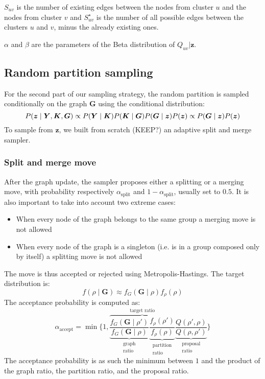 $S_{uv}$ is the number of existing edges between the nodes from cluster $u$ and the nodes from cluster $v$ and $S^{\star}_{uv}$ is the number of all possible edges between the clusters $u$ and $v$, minus the already existing ones. 

$\alpha$ and $\beta$ are the parameters of the Beta distribution of $Q_{uv}\vert \bm{z}$.

\subsection{Random partition sampling}
For the second part of our sampling strategy, the random partition is sampled conditionally on the graph $\bm{G}$ using the conditional distribution:
\begin{equation*}
    \small P(\bm{z} \mid \bm{Y},\bm{K},\bm{G}) \propto P(\bm{Y} \mid \bm{K})P(\bm{K} \mid \bm{G})P(\bm{G} \mid \bm{z})P(\bm{z}) \propto P(\bm{G} \mid \bm{z})P(\bm{z})
\end{equation*}
To sample from $\bm{z}$, we built from scratch (KEEP?) an adaptive split and merge sampler.

\subsubsection{Split and merge move}

After the graph update, the sampler proposes either a splitting or a merging move, with probability respectively $\alpha_{\text{split}}$ and $1-\alpha_{\text{split}}$, usually set to $0.5$.
It is also important to take into account two extreme cases:
\begin{itemize}
    \item When every node of the graph belongs to the same group a merging move is not allowed
    \item When every node of the graph is a singleton (i.e. is in a group composed only by itself) a splitting move is not allowed
\end{itemize}
The move is thus accepted or rejected using Metropolis-Hastings. 
The target distribution is:
\begin{equation*}
    f(\rho \mid \bm{G}) \approx f_G(\bm{G} \mid \rho) f_{\rho}(\rho)
\end{equation*}
The acceptance probability is computed as:
 \[
   \alpha_{\text{accept}} = \min
   \bigg\{1,
   \overbrace{
   \underbrace{\frac{f_G\left(\bm{G} \mid \rho'\right)}{f_G(\bm{G} \mid \rho)}}_{\substack{\text{graph}\\\text{ratio}}}
   \underbrace{\frac{f_\rho\left(\rho'\right)}{f_\rho(\rho)}}_{\substack{\text{partition}\\\text{ratio}}}
   }^{\text{target ratio}}
   \underbrace{\frac{Q(\rho',\rho)}{Q(\rho,\rho')}}_{\substack{\text{proposal}\\\text{ratio}}}
   \bigg\}
\]
The acceptance probability is as such the minimum between $1$ and the product of the graph ratio, the partition ratio, and the proposal ratio.
